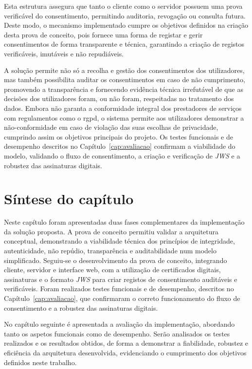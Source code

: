 Esta estrutura assegura que tanto o cliente como o servidor possuem uma prova verificável do consentimento, permitindo auditoria, revogação ou consulta futura. Deste modo, o mecanismo implementado cumpre os objetivos definidos na criação desta prova de conceito, pois fornece uma forma de registar e gerir consentimentos de forma transparente e técnica, garantindo a criação de registos verificáveis, imutáveis e não repudiáveis.

A solução permite não só a recolha e gestão dos consentimentos dos utilizadores, mas também possibilita auditar os consentimentos em caso de não cumprimento, promovendo a transparência e fornecendo evidência técnica irrefutável de que as decisões dos utilizadores foram, ou não foram, respeitadas no tratamento dos dados. Embora não garanta a conformidade integral dos prestadores de serviços com regulamentos como o \acrshort{rgpd}, o sistema permite aos utilizadores demonstrar a não-conformidade em caso de violação das suas escolhas de privacidade, cumprindo assim os objetivos principais do projeto. Os testes funcionais e de desempenho descritos no Capítulo~\ref{cap:avaliacao} confirmam a viabilidade do modelo, validando o fluxo de consentimento, a criação e verificação de \textit{JWS} e a robustez das assinaturas digitais.

\section{Síntese do capítulo}

Neste capítulo foram apresentadas duas fases complementares da implementação da solução proposta. A prova de conceito permitiu validar a arquitetura conceptual, demonstrando a viabilidade técnica dos princípios de integridade, autenticidade, não repúdio, transparência e auditabilidade num modelo simplificado. Seguiu-se o desenvolvimento da prova de conceito, integrando cliente, servidor e interface web, com a utilização de certificados digitais, assinaturas e o formato \textit{JWS} para criar registos de consentimento auditáveis e verificáveis. Foram realizados testes funcionais e de desempenho, descritos no Capítulo~\ref{cap:avaliacao}, que confirmaram o correto funcionamento do fluxo de consentimento e a robustez das assinaturas digitais.  

No capítulo seguinte é apresentada a avaliação da implementação, abordando tanto os aspetos funcionais como de desempenho. Serão analisados os testes realizados e os resultados obtidos, de forma a demonstrar a fiabilidade, robustez e eficiência da arquitetura desenvolvida, evidenciando o cumprimento dos objetivos definidos neste trabalho.
